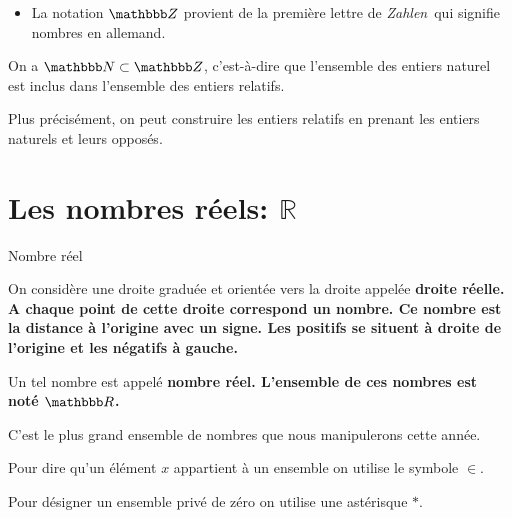 \documentclass[10pt,a4paper,openany,twoside,prof]{book}
\begin{document}
\begin{rem}
	\begin{itemize}
		\item
		La notation $\Z$ provient de la première lettre de \guillemotleft \textit{Zahlen}\guillemotright \ qui signifie nombres en allemand.
	\end{itemize}
\end{rem}

\begin{prop}{}{}
	On a $\N\subset\Z$, c'est-à-dire que l'ensemble des entiers naturel est inclus dans l'ensemble des entiers relatifs.

	Plus précisément, on peut construire les entiers relatifs en prenant les entiers naturels et leurs opposés.
\end{prop}


\section{Les nombres réels: $\mathbb{R}$}

\vspace{-3mm}
\begin{defi}{Nombre réel}{}
	\begin{center}
	\end{center}
	On considère une droite graduée et orientée vers la droite appelée \bf{droite réelle}. A chaque point de cette droite correspond un nombre. Ce nombre est la distance à l'origine avec un signe. Les positifs se situent à droite de l'origine et les négatifs à gauche.

	Un tel nombre est appelé \bf{nombre réel}. L'ensemble de ces nombres est noté $\R$.
\end{defi}

\begin{rem}{}{}
	C'est le plus grand ensemble de nombres que nous manipulerons cette année.
\end{rem}

\begin{notation}{}{}
	Pour dire qu'un élément $x$ appartient à un ensemble on utilise le symbole $\in$.

	Pour désigner un ensemble privé de zéro on utilise une astérisque $*$.
\end{notation}
\end{document}
